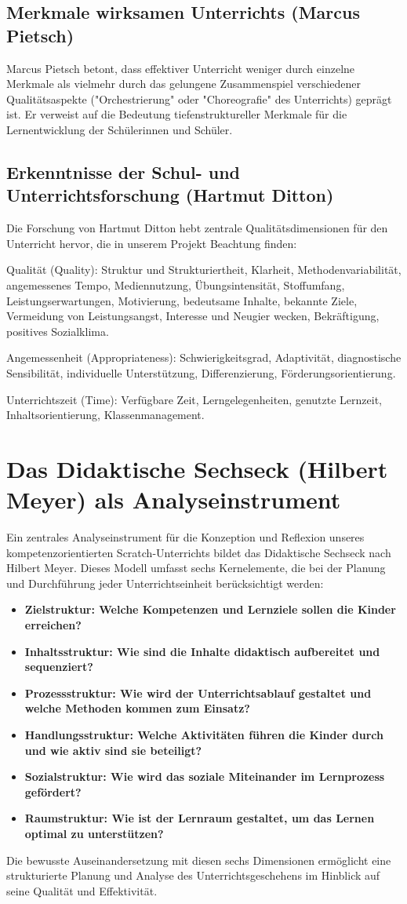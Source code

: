 \subsection{Merkmale wirksamen Unterrichts (Marcus Pietsch)}
Marcus Pietsch betont, dass effektiver Unterricht weniger durch einzelne Merkmale als vielmehr durch das gelungene Zusammenspiel verschiedener Qualitätsaspekte ("Orchestrierung" oder "Choreografie" des Unterrichts) geprägt ist. Er verweist auf die Bedeutung tiefenstruktureller Merkmale für die Lernentwicklung der Schülerinnen und Schüler.
\subsection{Erkenntnisse der Schul- und Unterrichtsforschung (Hartmut Ditton)}
Die Forschung von Hartmut Ditton hebt zentrale Qualitätsdimensionen für den Unterricht hervor, die in unserem Projekt Beachtung finden:

Qualität (Quality): Struktur und Strukturiertheit, Klarheit, Methodenvariabilität, angemessenes Tempo, Mediennutzung, Übungsintensität, Stoffumfang, Leistungserwartungen, Motivierung, bedeutsame Inhalte, bekannte Ziele, Vermeidung von Leistungsangst, Interesse und Neugier wecken, Bekräftigung, positives Sozialklima.

Angemessenheit (Appropriateness): Schwierigkeitsgrad, Adaptivität, diagnostische Sensibilität, individuelle Unterstützung, Differenzierung, Förderungsorientierung.

Unterrichtszeit (Time): Verfügbare Zeit, Lerngelegenheiten, genutzte Lernzeit, Inhaltsorientierung, Klassenmanagement.
\section{Das Didaktische Sechseck (Hilbert Meyer) als Analyseinstrument}
Ein zentrales Analyseinstrument für die Konzeption und Reflexion unseres kompetenzorientierten Scratch-Unterrichts bildet das Didaktische Sechseck nach Hilbert Meyer. Dieses Modell umfasst sechs Kernelemente, die bei der Planung und Durchführung jeder Unterrichtseinheit berücksichtigt werden:
\begin{itemize}
    \item \textbf{Zielstruktur: Welche Kompetenzen und Lernziele sollen die Kinder erreichen?}
    \item \textbf{Inhaltsstruktur: Wie sind die Inhalte didaktisch aufbereitet und sequenziert?}
    \item \textbf{Prozessstruktur: Wie wird der Unterrichtsablauf gestaltet und welche Methoden kommen zum Einsatz?}
    \item \textbf{Handlungsstruktur: Welche Aktivitäten führen die Kinder durch und wie aktiv sind sie beteiligt?}
    \item \textbf{Sozialstruktur: Wie wird das soziale Miteinander im Lernprozess gefördert?}
    \item \textbf{Raumstruktur: Wie ist der Lernraum gestaltet, um das Lernen optimal zu unterstützen?}
\end{itemize}
Die bewusste Auseinandersetzung mit diesen sechs Dimensionen ermöglicht eine strukturierte Planung und Analyse des Unterrichtsgeschehens im Hinblick auf seine Qualität und Effektivität.
